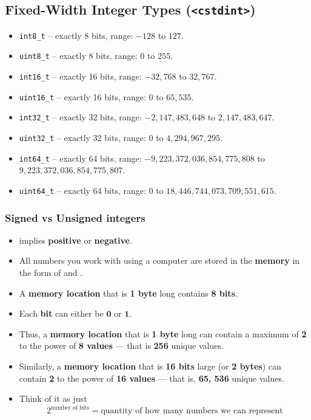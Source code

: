 \documentclass[10pt]{article}
\newcommand{\vocab}[1]{\fbox{\textbf{\textit{#1}}}}
\begin{document}
\subsection*{Fixed-Width Integer Types (\texttt{<cstdint>})}
\begin{itemize}
    \item \verb|int8_t| -- exactly 8 bits, range: $-128$ to $127$.
    \item \verb|uint8_t| -- exactly 8 bits, range: $0$ to $255$.
    \item \verb|int16_t| -- exactly 16 bits, range: $-32,\!768$ to $32,\!767$.
    \item \verb|uint16_t| -- exactly 16 bits, range: $0$ to $65,\!535$.
    \item \verb|int32_t| -- exactly 32 bits, range: $-2,\!147,\!483,\!648$ to $2,\!147,\!483,\!647$.
    \item \verb|uint32_t| -- exactly 32 bits, range: $0$ to $4,\!294,\!967,\!295$.
    \item \verb|int64_t| -- exactly 64 bits, range: $-9,\!223,\!372,\!036,\!854,\!775,\!808$ to $9,\!223,\!372,\!036,\!854,\!775,\!807$.
    \item \verb|uint64_t| -- exactly 64 bits, range: $0$ to $18,\!446,\!744,\!073,\!709,\!551,\!615$.
\end{itemize}

\newpage 
\subsubsection{Signed vs Unsigned integers}
\begin{itemize}
	\item \vocab{Sign} implies \textbf{positive} or \textbf{negative}.
	\item All numbers you work with using a computer are stored in the \textbf{memory} in the form of \vocab{bits} and \vocab{bytes}.

	\item A \textbf{memory location} that is \textbf{1 byte} long contains \textbf{8 bits}.

	\item Each \textbf{bit} can either be $\mathbf{0}$ or $\mathbf{1}$.

	\item Thus, a \textbf{memory location} that is \textbf{1 byte} long can contain a maximum of \textbf{2} to the power of \textbf{8 values} --- that is \textbf{256} unique values.

	\item Similarly, a \textbf{memory location} that is \textbf{16 bits} large (or \textbf{2 bytes}) can contain \textbf{2} to the power of \textbf{16 values} --- that is, \textbf{65, 536} unique values.

	\item Think of it as just
		\[
			2^{\text{number of bits}} = \text{quantity of how many numbers we can represent}
		\]
\end{itemize}
\end{document}
